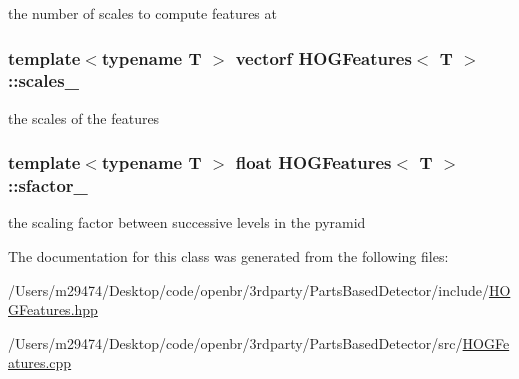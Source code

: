 the number of scales to compute features at 

\hypertarget{class_h_o_g_features_a27490a8c33c7ffbfdeedafc5af0ad544}{
\subsubsection[{scales\-\_\-}]{\setlength{\rightskip}{0pt plus 5cm}template$<$typename T $>$ {\bf vectorf} {\bf H\-O\-G\-Features}$<$ T $>$\-::scales\-\_\-\hspace{0.3cm}{\ttfamily [private]}}}\label{class_h_o_g_features_a27490a8c33c7ffbfdeedafc5af0ad544}


the scales of the features 

\hypertarget{class_h_o_g_features_a45b232ca94e93b4f30d342374e62578f}{
\subsubsection[{sfactor\-\_\-}]{\setlength{\rightskip}{0pt plus 5cm}template$<$typename T $>$ float {\bf H\-O\-G\-Features}$<$ T $>$\-::sfactor\-\_\-\hspace{0.3cm}{\ttfamily [private]}}}\label{class_h_o_g_features_a45b232ca94e93b4f30d342374e62578f}


the scaling factor between successive levels in the pyramid 



The documentation for this class was generated from the following files\-:\begin{DoxyCompactItemize}
\item 
/\-Users/m29474/\-Desktop/code/openbr/3rdparty/\-Parts\-Based\-Detector/include/\hyperlink{_h_o_g_features_8hpp}{H\-O\-G\-Features.\-hpp}\item 
/\-Users/m29474/\-Desktop/code/openbr/3rdparty/\-Parts\-Based\-Detector/src/\hyperlink{_h_o_g_features_8cpp}{H\-O\-G\-Features.\-cpp}\end{DoxyCompactItemize}
